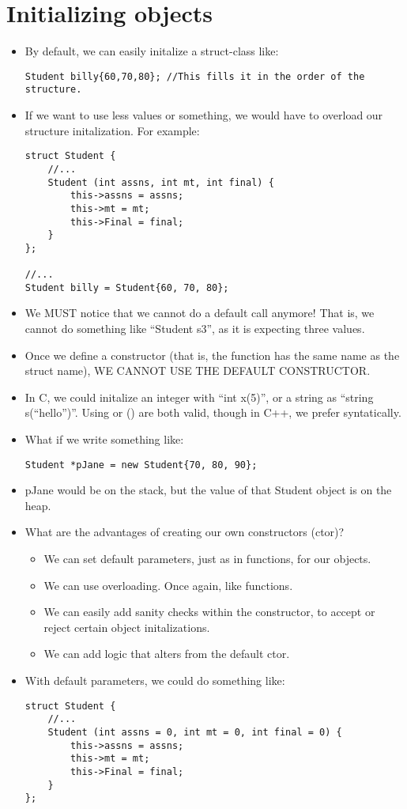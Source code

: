 \documentclass{article}
\begin{document}
\section{Initializing objects}
\begin{itemize}
\item By default, we can easily initalize a struct-class like:
\begin{lstlisting}
Student billy{60,70,80}; //This fills it in the order of the structure.
\end{lstlisting}
\item If we want to use less values or something, we would have to overload our structure initalization.  For example:
\begin{lstlisting}
struct Student {
    //...
    Student (int assns, int mt, int final) {
        this->assns = assns;
        this->mt = mt;
        this->Final = final;
    }
};

//...
Student billy = Student{60, 70, 80};
\end{lstlisting}
\item We MUST notice that we cannot do a default call anymore!  That is, we cannot do something like ``Student s3'', as it is expecting three values.
\item Once we define a constructor (that is, the function has the same name as the struct name), WE CANNOT USE THE DEFAULT CONSTRUCTOR.
\item In C, we could initalize an integer with ``int x(5)'', or a string as ``string s(``hello'')''.  Using {} or () are both valid, though in C++, we prefer {} syntatically.
\item What if we write something like:
\begin{lstlisting}
Student *pJane = new Student{70, 80, 90};
\end{lstlisting}
\item pJane would be on the stack, but the value of that Student object is on the heap.
\item What are the advantages of creating our own constructors (ctor)?
\begin{itemize}
\item We can set default parameters, just as in functions, for our objects.
\item We can use overloading.  Once again, like functions.
\item We can easily add sanity checks within the constructor, to accept or reject certain object initalizations.
\item We can add logic that alters from the default ctor.
\end{itemize}
\item With default parameters, we could do something like:
\begin{lstlisting}
struct Student {
    //...
    Student (int assns = 0, int mt = 0, int final = 0) {
        this->assns = assns;
        this->mt = mt;
        this->Final = final;
    }
};


\end{lstlisting}
\end{itemize}
\end{document}
